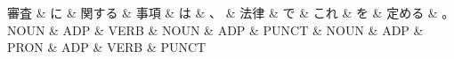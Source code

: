 \documentclass[tikz,border=5pt]{standalone}
\begin{document}
\normalsize
\begin{dependency}[edge unit distance=12.0pt]
    \begin{deptext}[column sep=1em]
        審査 \& に \& 関する \& 事項 \& は \& 、 \& 法律 \& で \& これ \& を \& 定める \& 。\\
        NOUN \& ADP \& VERB \& NOUN \& ADP \& PUNCT \& NOUN \& ADP \& PRON \& ADP \& VERB \& PUNCT\\
    \end{deptext}
\end{dependency}
\end{document}
